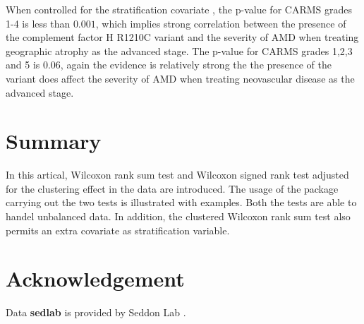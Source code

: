 \documentclass[nojss]{jss}\usepackage[]{graphicx}\usepackage[]{color}
\begin{document}
When controlled for the stratification covariate ,
the p-value for CARMS grades 1-4 is less than $0.001$,
which implies strong correlation between the
presence of the complement factor H R1210C variant and
the severity of AMD when treating geographic atrophy as the
advanced stage. The p-value for CARMS grades 1,2,3 and 5
is 0.06, again the evidence is relatively strong the
the presence of the variant does affect the severity of
AMD when treating neovascular disease as the advanced stage.





\section{Summary}
\label{summ}
In this artical, Wilcoxon rank sum test and Wilcoxon signed rank
test adjusted for the clustering effect in the data are
introduced. The usage of the  package  carrying out the
two tests is illustrated with examples.
Both the tests are able to handel unbalanced data.
In addition, the clustered Wilcoxon rank sum test also permits an
extra covariate as stratification variable.
\section*{Acknowledgement}
Data \textbf{sedlab} is provided by Seddon Lab
\citep{Sedd:Shar:Adel:eval:2006,
Ferr:Sedd:phen:2015}.


%


\end{document}
